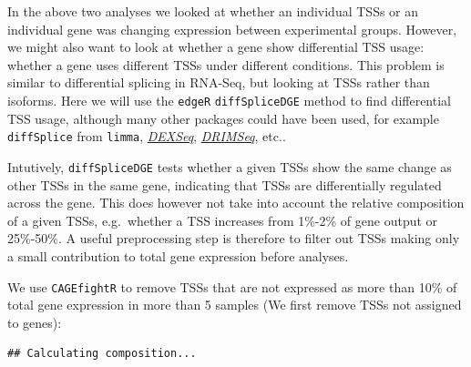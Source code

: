 \documentclass[9pt,a4paper,]{extarticle}
\newenvironment{Shaded}{\begin{snugshade}}{\end{snugshade}}
\newcommand{\KeywordTok}[1]{\textcolor[rgb]{0.13,0.29,0.53}{\textbf{{#1}}}}
\newcommand{\DataTypeTok}[1]{\textcolor[rgb]{0.13,0.29,0.53}{{#1}}}
\newcommand{\DecValTok}[1]{\textcolor[rgb]{0.00,0.00,0.81}{{#1}}}
\newcommand{\FloatTok}[1]{\textcolor[rgb]{0.00,0.00,0.81}{{#1}}}
\newcommand{\StringTok}[1]{\textcolor[rgb]{0.31,0.60,0.02}{{#1}}}
\newcommand{\CommentTok}[1]{\textcolor[rgb]{0.56,0.35,0.01}{\textit{{#1}}}}
\newcommand{\NormalTok}[1]{{#1}}
\begin{document}
In the above two analyses we looked at whether an individual TSSs or an individual gene was changing expression between experimental groups. However, we might also want to look at whether a gene show differential TSS usage: whether a gene uses different TSSs under different conditions. This problem is similar to differential splicing in RNA-Seq, but looking at TSSs rather than isoforms\citep{Soneson2016}. Here we will use the \texttt{edgeR} \texttt{diffSpliceDGE} method to find differential TSS usage, although many other packages could have been used, for example \texttt{diffSplice} from \texttt{limma}, \emph{\href{https://bioconductor.org/packages/3.8/DEXSeq}{DEXSeq}}, \emph{\href{https://bioconductor.org/packages/3.8/DRIMSeq}{DRIMSeq}}, etc..

Intutively, \texttt{diffSpliceDGE} tests whether a given TSSs show the same change as other TSSs in the same gene, indicating that TSSs are differentially regulated across the gene. This does however not take into account the relative composition of a given TSSs, e.g.~whether a TSS increases from 1\%-2\% of gene output or 25\%-50\%. A useful preprocessing step is therefore to filter out TSSs making only a small contribution to total gene expression before analyses.

We use \texttt{CAGEfightR} to remove TSSs that are not expressed as more than 10\% of total gene expression in more than 5 samples (We first remove TSSs not assigned to genes):

\begin{Shaded}
\end{Shaded}

\begin{verbatim}
## Calculating composition...
\end{verbatim}
\end{document}
